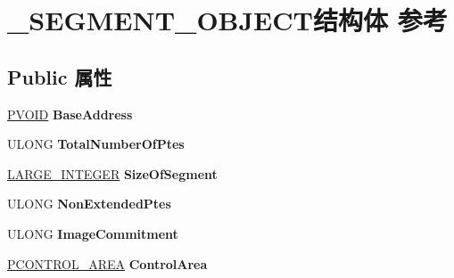 \hypertarget{struct___s_e_g_m_e_n_t___o_b_j_e_c_t}{}\section{\+\_\+\+S\+E\+G\+M\+E\+N\+T\+\_\+\+O\+B\+J\+E\+C\+T结构体 参考}
\label{struct___s_e_g_m_e_n_t___o_b_j_e_c_t}
\subsection*{Public 属性}
\begin{DoxyCompactItemize}
\item 
\mbox{\label{struct___s_e_g_m_e_n_t___o_b_j_e_c_t_a088d8382b6e0d910b52617a67d076eb0}} 
\hyperlink{interfacevoid}{P\+V\+O\+ID} {\bfseries Base\+Address}
\item 
\mbox{\label{struct___s_e_g_m_e_n_t___o_b_j_e_c_t_a070d3b2664c0455a553589ec565ce427}} 
U\+L\+O\+NG {\bfseries Total\+Number\+Of\+Ptes}
\item 
\mbox{\label{struct___s_e_g_m_e_n_t___o_b_j_e_c_t_ad8caf7fa7bc3133db1d80d1289941013}} 
\hyperlink{union___l_a_r_g_e___i_n_t_e_g_e_r}{L\+A\+R\+G\+E\+\_\+\+I\+N\+T\+E\+G\+ER} {\bfseries Size\+Of\+Segment}
\item 
\mbox{\label{struct___s_e_g_m_e_n_t___o_b_j_e_c_t_ac5e6d6dec6bce218f0e7ac1ce22f0794}} 
U\+L\+O\+NG {\bfseries Non\+Extended\+Ptes}
\item 
\mbox{\label{struct___s_e_g_m_e_n_t___o_b_j_e_c_t_ad283977564e45fcb1fab71ddc15a3cde}} 
U\+L\+O\+NG {\bfseries Image\+Commitment}
\item 
\mbox{\label{struct___s_e_g_m_e_n_t___o_b_j_e_c_t_a03ef71ea2b53ffa6db79891f9dd609dc}} 
\hyperlink{struct___c_o_n_t_r_o_l___a_r_e_a}{P\+C\+O\+N\+T\+R\+O\+L\+\_\+\+A\+R\+EA} {\bfseries Control\+Area}
\item 
\mbox{\label{struct___s_e_g_m_e_n_t___o_b_j_e_c_t_ada84006901ae7a1f675a635894e2bebc}} 

\end{DoxyCompactItemize}
